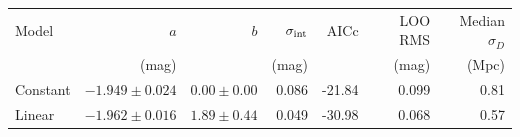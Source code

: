 \begin{tabular}{lrrrrrr}
\toprule
Model & $a$ & $b$ & $\sigma_{\rm int}$ & AICc & LOO RMS & Median $\sigma_D$ \\
 & (mag) & & (mag) & & (mag) & (Mpc) \\
\midrule
Constant & $-1.949\pm0.024$ & $0.00\pm0.00$ & 0.086 & -21.84 & 0.099 & 0.81 \\
Linear & $-1.962\pm0.016$ & $1.89\pm0.44$ & 0.049 & -30.98 & 0.068 & 0.57 \\
\bottomrule
\end{tabular}
